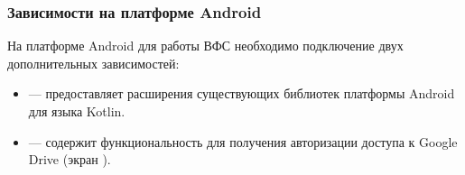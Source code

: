   \subsubsection{Зависимости на платформе Android}
    На платформе Android для работы ВФС  необходимо подключение двух дополнительных зависимостей:
    \begin{itemize}
      \item {}\cite{android-ktx-dep} --- предоставляет расширения существующих библиотек платформы Android для языка Kotlin.
      \item {}\cite{play-services-auth-dep} --- содержит функциональность для получения авторизации доступа к Google Drive (экран ).
    \end{itemize}

